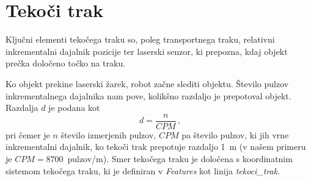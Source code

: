 %
%
%
%
%


\section{Tekoči trak}

Ključni elementi tekočega traku so, poleg transportnega traku, relativni inkrementalni dajalnik pozicije ter laserski senzor, ki prepozna, kdaj objekt prečka določeno točko na traku.

Ko objekt prekine laserski žarek, robot začne slediti objektu. Število pulzov inkrementalnega dajalnika nam pove, kolikšno razdaljo je prepotoval objekt. Razdalja $d$ je podana kot
\begin{equation}\
  d = \frac{n}{CPM} \, ,
\end{equation}
pri čemer je $n$ število izmerjenih pulzov, $CPM$ pa število pulzov, ki jih vrne inkrementalni dajalnik, ko tekoči trak prepotuje razdaljo 1~m (v našem primeru je $CPM = 8700$~pulzov/m). Smer tekočega traku je določena s koordinatnim sistemom tekočega traku, ki je definiran v \emph{Features} kot linija \emph{tekoci\_trak}.

